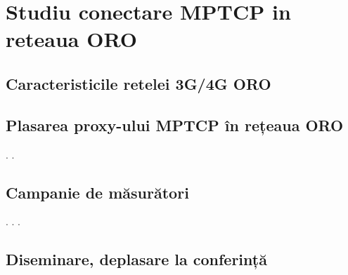 \chapter{Studiu conectare MPTCP in reteaua ORO}

\section{Caracteristicile retelei 3G/4G ORO}
\section{Plasarea proxy-ului MPTCP în rețeaua ORO}
.
\newpage
.
\newpage
\section{Campanie de măsurători}
.
\newpage
.
\newpage
.
\newpage
\section{Diseminare, deplasare la conferință}


